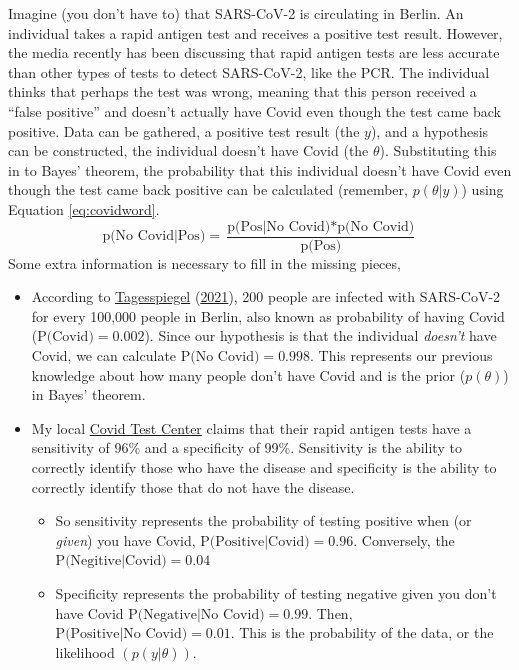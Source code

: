 \documentclass[12pt,twoside]{reedthesis}
\providecommand{\tightlist}{%
  \setlength{\itemsep}{0pt}\setlength{\parskip}{0pt}}
\begin{document}
Imagine (you don't have to) that SARS-CoV-2 is circulating in Berlin. An individual takes a rapid antigen test and receives a positive test result. However, the media recently has been discussing that rapid antigen tests are less accurate than other types of tests to detect SARS-CoV-2, like the PCR. The individual thinks that perhaps the test was wrong, meaning that this person received a ``false positive'' and doesn't actually have Covid even though the test came back positive. Data can be gathered, a positive test result (the \(y\)), and a hypothesis can be constructed, the individual doesn't have Covid (the \(\theta\)). Substituting this in to Bayes' theorem, the probability that this individual doesn't have Covid even though the test came back positive can be calculated (remember, \(p(\theta|y)\)) using Equation \eqref{eq:covidword}.
\begin{equation}
\text{p(No Covid|Pos)} = \frac{\text{p(Pos|No Covid)} * \text{p(No Covid)}}{\text{p(Pos)}}
\label{eq:covidword}
\end{equation}
Some extra information is necessary to fill in the missing pieces,
\begin{itemize}
\item
  According to \protect\hyperlink{ref-tagesspiegelCoronavirusKarteDeutschlandweiteFallzahlen2021}{Tagesspiegel} (\protect\hyperlink{ref-tagesspiegelCoronavirusKarteDeutschlandweiteFallzahlen2021}{2021}), 200 people are infected with SARS-CoV-2 for every 100,000 people in Berlin, also known as probability of having Covid (\(\text{P(Covid)} = 0.002\)). Since our hypothesis is that the individual \emph{doesn't} have Covid, we can calculate \(\text{P(No Covid)} = 0.998\). This represents our previous knowledge about how many people don't have Covid and is the prior (\(p(\theta)\)) in Bayes' theorem.
\item
  My local \href{https://schnell.coronatest.de/?lang=en}{Covid Test Center} claims that their rapid antigen tests have a sensitivity of 96\% and a specificity of 99\%. Sensitivity is the ability to correctly identify those who have the disease and specificity is the ability to correctly identify those that do not have the disease.
  \begin{itemize}
  \tightlist
  \item
    So sensitivity represents the probability of testing positive when (or \emph{given}) you have Covid, \(\text{P(Positive|Covid)} = 0.96\). Conversely, the \(\text{P(Negitive|Covid)} = 0.04\)
  \item
    Specificity represents the probability of testing negative given you don't have Covid \(\text{P(Negative|No Covid)} = 0.99\). Then, \(\text{P(Positive|No Covid)} = 0.01\). This is the probability of the data, or the likelihood \((p(y|\theta))\).
  \end{itemize}
\end{itemize}
\end{document}
